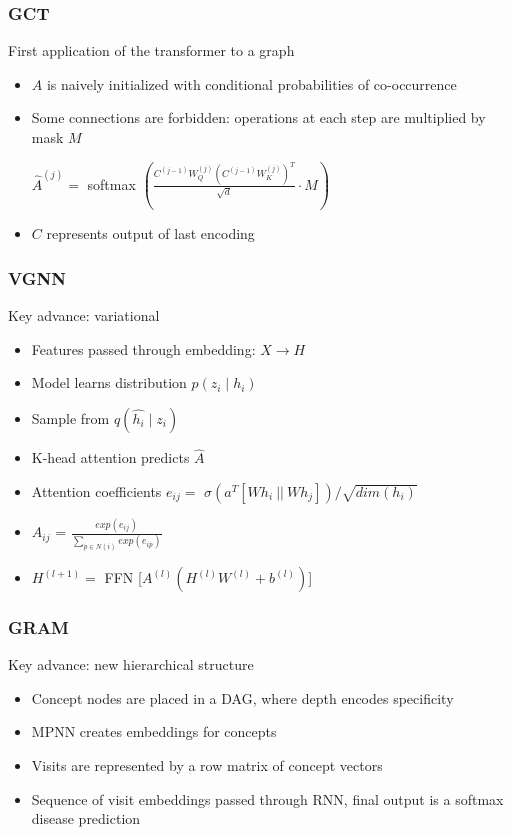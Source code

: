\documentclass{beamer}
\begin{document}


\begin{frame}
    \frametitle{GCT}
	First application of the transformer to a graph
    \begin{itemize}
        \item $A$ is naively initialized with conditional probabilities of co-occurrence
        \item Some connections are forbidden: operations at each step are multiplied by mask $M$
        \begin{center}
        $\hat{A} ^{(j)}= $ softmax $ (\frac{C^{(j-1)}W^{(j)}_Q(C^{(j-1)}W^{(j)}_K)^T}{\sqrt{d}} \cdot M)$
        \end{center}
        \item $C$ represents output of last encoding
    \end{itemize} 
    

    \end{frame}
    


\begin{frame}
    \frametitle{VGNN}
	Key advance: variational
   \begin{itemize}
        \item Features passed through embedding: $X \rightarrow H$
        \item Model learns distribution $p(z_i \mid h_i)$
        \item Sample from $q(\hat{h_i} \mid z_i)$
        \item K-head attention predicts $\widehat{A}$
        \item Attention coefficients $e_{ij} = $ $\sigma(a^T[Wh_i \ || \ Wh_j])/\sqrt{dim(h_i)}$
	    \item $A_{ij}$ = $\frac{exp(e_{ij})}{\sum\limits_{p \in N(i)} exp(e_{ip})}$

        \item $H^{(l+1)} = $ FFN [$A^{(l)}(H^{(l)}W^{(l)} + b^{(l)})$]
    \end{itemize}
    
    

    \end{frame}

\begin{frame}
    \frametitle{GRAM}
	Key advance: new hierarchical structure
    \begin{itemize}
        \item Concept nodes are placed in a DAG, where depth encodes specificity
        \item MPNN creates embeddings for concepts
        \item Visits are represented by a row matrix of concept vectors
        \item Sequence of visit embeddings passed through RNN, final output is a softmax disease prediction
    \end{itemize}
    

    \end{frame}
    
\end{document}
